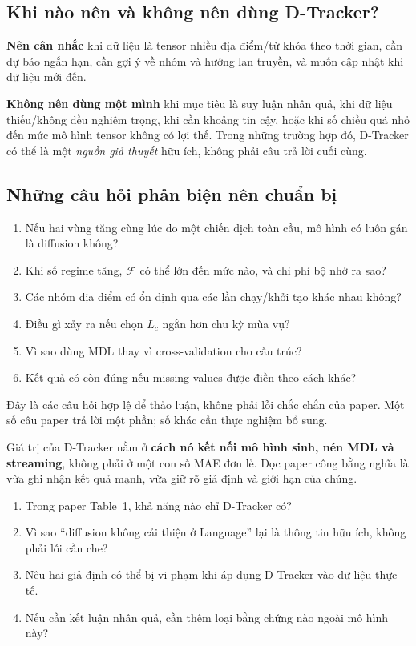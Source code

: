 \subsection{Khi nào nên và không nên dùng D-Tracker?}

\textbf{Nên cân nhắc} khi dữ liệu là tensor nhiều địa điểm/từ khóa theo thời gian, cần dự báo ngắn
hạn, cần gợi ý về nhóm và hướng lan truyền, và muốn cập nhật khi dữ liệu mới đến.

\textbf{Không nên dùng một mình} khi mục tiêu là suy luận nhân quả, khi dữ liệu thiếu/không đều
nghiêm trọng, khi cần khoảng tin cậy, hoặc khi số chiều quá nhỏ đến mức mô hình tensor không có lợi
thế. Trong những trường hợp đó, D-Tracker có thể là một \emph{nguồn giả thuyết} hữu ích, không phải
câu trả lời cuối cùng.

\subsection{Những câu hỏi phản biện nên chuẩn bị}

\begin{enumerate}
  \item Nếu hai vùng tăng cùng lúc do một chiến dịch toàn cầu, mô hình có luôn gán là diffusion không?
  \item Khi số regime tăng, $\mathcal{F}$ có thể lớn đến mức nào, và chi phí bộ nhớ ra sao?
  \item Các nhóm địa điểm có ổn định qua các lần chạy/khởi tạo khác nhau không?
  \item Điều gì xảy ra nếu chọn $L_c$ ngắn hơn chu kỳ mùa vụ?
  \item Vì sao dùng MDL thay vì cross-validation cho cấu trúc?
  \item Kết quả có còn đúng nếu missing values được điền theo cách khác?
\end{enumerate}
Đây là các câu hỏi hợp lệ để thảo luận, không phải lỗi chắc chắn của paper. Một số câu paper trả lời
một phần; số khác cần thực nghiệm bổ sung.

\begin{keypoint}
Giá trị của D-Tracker nằm ở \textbf{cách nó kết nối mô hình sinh, nén MDL và streaming}, không phải
ở một con số MAE đơn lẻ. Đọc paper công bằng nghĩa là vừa ghi nhận kết quả mạnh, vừa giữ rõ giả định
và giới hạn của chúng.
\end{keypoint}

\begin{selfcheck}
\begin{enumerate}
  \item Trong paper Table~1, khả năng nào chỉ D-Tracker có?
  \item Vì sao ``diffusion không cải thiện ở Language'' lại là thông tin hữu ích, không phải lỗi cần che?
  \item Nêu hai giả định có thể bị vi phạm khi áp dụng D-Tracker vào dữ liệu thực tế.
  \item Nếu cần kết luận nhân quả, cần thêm loại bằng chứng nào ngoài mô hình này?
\end{enumerate}
\end{selfcheck}
